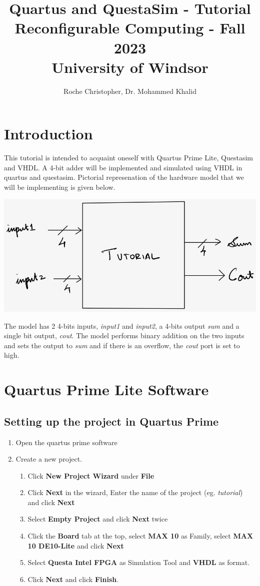 \documentclass{article}
\title{Quartus and QuestaSim - Tutorial \\ Reconfigurable Computing - Fall 2023 \\ University of Windsor}
\date{}
\author{Roche Christopher, Dr. Mohammed Khalid}
\begin{document}
	
	\maketitle
	\section{Introduction}
	This tutorial is intended to acquaint oneself with Quartus Prime Lite, Questasim and VHDL. A 4-bit adder will be implemented and simulated using VHDL in quartus and questasim. Pictorial represenation of the hardware model that we will be implementing is given below.
	
	\includegraphics{rc_tutorial_entity_diagram.jpg}
	
	The model has 2 4-bits inputs, \textit{input1} and \textit{input2}, a 4-bits output \textit{sum} and a single bit output, \textit{cout}. The model performs binary addition on the two inputs and sets the output to \textit{sum} and if there is an overflow, the \textit{cout} port is set to high.
	
	\section{Quartus Prime Lite Software}
	\subsection{Setting up the project in Quartus Prime}
	\begin{enumerate}
		\item Open the quartus prime software 
		\item Create a new project.
		\begin{enumerate}
			\item Click \textbf{New Project Wizard} under \textbf \textbf{File}
			\item Click \textbf{Next} in the wizard, Enter the name of the project (eg. \textit{tutorial}) and click \textbf{Next}
			\item Select \textbf{Empty Project} and click \textbf{Next} twice
			\item Click the \textbf{Board} tab at the top, select \textbf{MAX 10} as Family, select \textbf{MAX 10 DE10-Lite} and click \textbf{Next}
			\item Select \textbf{Questa Intel FPGA} as Simulation Tool and \textbf{VHDL} as format.
			\item Click \textbf{Next} and click \textbf{Finish}.
		\end{enumerate}
	\end{enumerate}
\end{document}
